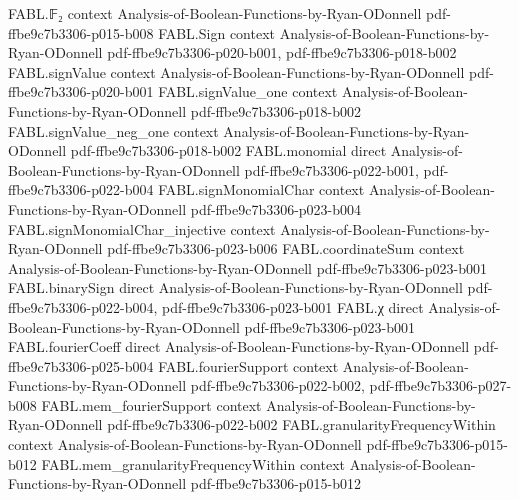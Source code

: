 \begin{theorem}
\label{FABL.uniformLpNorm_two_eq_spectralPNorm_two}
\leanok
{}
\proofstep
  {FABL.𝔽₂}
  {context}
  {Analysis-of-Boolean-Functions-by-Ryan-ODonnell}
  {pdf-ffbe9c7b3306-p015-b008}
\proofstep
  {FABL.Sign}
  {context}
  {Analysis-of-Boolean-Functions-by-Ryan-ODonnell}
  {pdf-ffbe9c7b3306-p020-b001,
    pdf-ffbe9c7b3306-p018-b002}
\proofstep
  {FABL.signValue}
  {context}
  {Analysis-of-Boolean-Functions-by-Ryan-ODonnell}
  {pdf-ffbe9c7b3306-p020-b001}
\proofstep
  {FABL.signValue_one}
  {context}
  {Analysis-of-Boolean-Functions-by-Ryan-ODonnell}
  {pdf-ffbe9c7b3306-p018-b002}
\proofstep
  {FABL.signValue_neg_one}
  {context}
  {Analysis-of-Boolean-Functions-by-Ryan-ODonnell}
  {pdf-ffbe9c7b3306-p018-b002}
\proofstep
  {FABL.monomial}
  {direct}
  {Analysis-of-Boolean-Functions-by-Ryan-ODonnell}
  {pdf-ffbe9c7b3306-p022-b001,
    pdf-ffbe9c7b3306-p022-b004}
\proofstep
  {FABL.signMonomialChar}
  {context}
  {Analysis-of-Boolean-Functions-by-Ryan-ODonnell}
  {pdf-ffbe9c7b3306-p023-b004}
\proofstep
  {FABL.signMonomialChar_injective}
  {context}
  {Analysis-of-Boolean-Functions-by-Ryan-ODonnell}
  {pdf-ffbe9c7b3306-p023-b006}
\proofstep
  {FABL.coordinateSum}
  {context}
  {Analysis-of-Boolean-Functions-by-Ryan-ODonnell}
  {pdf-ffbe9c7b3306-p023-b001}
\proofstep
  {FABL.binarySign}
  {direct}
  {Analysis-of-Boolean-Functions-by-Ryan-ODonnell}
  {pdf-ffbe9c7b3306-p022-b004,
    pdf-ffbe9c7b3306-p023-b001}
\proofstep
  {FABL.χ}
  {direct}
  {Analysis-of-Boolean-Functions-by-Ryan-ODonnell}
  {pdf-ffbe9c7b3306-p023-b001}
\proofstep
  {FABL.fourierCoeff}
  {direct}
  {Analysis-of-Boolean-Functions-by-Ryan-ODonnell}
  {pdf-ffbe9c7b3306-p025-b004}
\proofstep
  {FABL.fourierSupport}
  {context}
  {Analysis-of-Boolean-Functions-by-Ryan-ODonnell}
  {pdf-ffbe9c7b3306-p022-b002,
    pdf-ffbe9c7b3306-p027-b008}
\proofstep
  {FABL.mem_fourierSupport}
  {context}
  {Analysis-of-Boolean-Functions-by-Ryan-ODonnell}
  {pdf-ffbe9c7b3306-p022-b002}
\proofstep
  {FABL.granularityFrequencyWithin}
  {context}
  {Analysis-of-Boolean-Functions-by-Ryan-ODonnell}
  {pdf-ffbe9c7b3306-p015-b012}
\proofstep
  {FABL.mem_granularityFrequencyWithin}
  {context}
  {Analysis-of-Boolean-Functions-by-Ryan-ODonnell}
  {pdf-ffbe9c7b3306-p015-b012}

\end{theorem}
